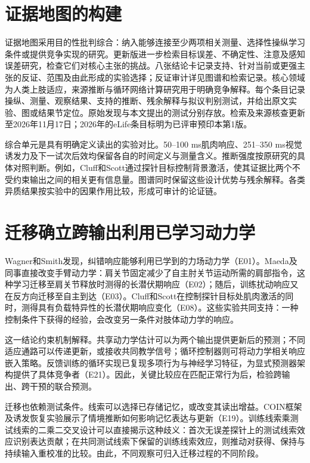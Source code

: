 \documentclass[11pt,a4paper]{article}
\begin{document}
\section{证据地图的构建}
证据地图采用目的性批判综合：纳入能够连接至少两项相关测量、选择性操纵学习条件或提供竞争实现的研究。更新版进一步检索目标误差、不确定性、注意及感知误差研究，检查它们对核心主张的挑战。八张结论卡记录支持、针对当前或更强主张的反证、范围及由此形成的实验选择；反证审计详见图谱和检索记录。核心领域为人类上肢适应，来源推断与循环网络计算研究用于明确竞争解释。每个条目记录操纵、测量、观察结果、支持的推断、残余解释与拟议判别测试，并给出原文实验、图或结果节定位。原始发现与本文提出的测试分别存放。检索及来源核查更新至2026年11月17日；2026年的eLife条目标明为已评审预印本第1版。\cite{makino2026}

综合单元是具有明确定义读出的实验对比。50--100 ms肌肉响应、251--350 ms视觉诱发力及下一试次后效均保留各自的时间定义与测量含义。推断强度按原研究的具体对照判断。例如，Cluff和Scott通过探针目标控制背景激活，使其证据比两个不受约束输出之间的相关更有信息量。图谱同时保留这些设计优势与残余解释。各类异质结果按实验中的因果作用比较，形成可审计的论证链。\cite{cluff2013,maeda2018,kasuga2015}

\section{迁移确立跨输出利用已学习动力学}
Wagner和Smith发现，纠错响应能够利用已学到的力场动力学（E01）。Maeda及同事直接改变手臂动力学：肩关节固定减少了自主肘关节运动所需的肩部指令，这种学习迁移至肩关节释放时测得的长潜伏期响应（E02）；随后，训练扰动响应又在反方向迁移至自主到达（E03）。Cluff和Scott在控制探针目标处肌肉激活的同时，测得具有负载特异性的长潜伏期响应变化（E08）。这些实验共同支持：一种控制条件下获得的经验，会改变另一条件对肢体动力学的响应。\cite{wagner2008,maeda2018,maeda2020,cluff2013}

这一结论约束机制解释。共享动力学估计可以为两个输出提供更新后的预测；不同适应通路可以传递更新，或接收共同教学信号；循环控制器则可将动力学相关响应嵌入策略。反馈训练的循环实现已复现多项行为与神经学习特征，为显式预测器架构提供了具体竞争者（E21）。因此，关键比较应在匹配正常行为后，检验跨输出、跨干预的联合预测。\cite{feulner2025}

迁移也依赖测试条件。线索可以选择已存储记忆，或改变其读出增益。COIN框架及诱发恢复实验展示了情境推断如何影响记忆表达与更新（E19）。训练线索乘测试线索的二乘二交叉设计可以直接揭示这种歧义：首次无误差探针上的测试线索效应识别表达贡献；在共同测试线索下保留的训练线索效应，则推动对获得、保持与持续输入重校准的比较。由此，不同观察可归入迁移过程的不同阶段。\cite{coin2021}
\end{document}
